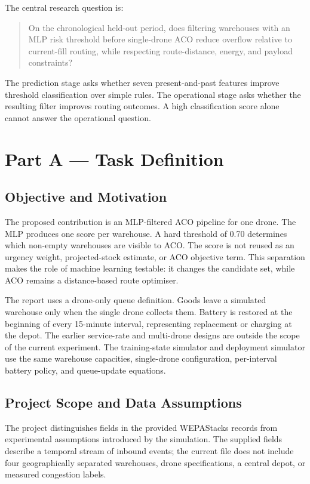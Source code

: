 \documentclass[10pt]{article}
\begin{document}
The central research question is:

\begin{quote}
On the chronological held-out period, does filtering warehouses with an MLP risk threshold before single-drone ACO reduce overflow relative to current-fill routing, while respecting route-distance, energy, and payload constraints?
\end{quote}

The prediction stage asks whether seven present-and-past features improve threshold classification over simple rules. The operational stage asks whether the resulting filter improves routing outcomes. A high classification score alone cannot answer the operational question.

\section{Part A --- Task Definition}

\subsection{Objective and Motivation}

The proposed contribution is an MLP-filtered ACO pipeline for one drone. The MLP produces one score per warehouse. A hard threshold of 0.70 determines which non-empty warehouses are visible to ACO. The score is not reused as an urgency weight, projected-stock estimate, or ACO objective term. This separation makes the role of machine learning testable: it changes the candidate set, while ACO remains a distance-based route optimiser.

The report uses a drone-only queue definition. Goods leave a simulated warehouse only when the single drone collects them. Battery is restored at the beginning of every 15-minute interval, representing replacement or charging at the depot. The earlier service-rate and multi-drone designs are outside the scope of the current experiment. The training-state simulator and deployment simulator use the same warehouse capacities, single-drone configuration, per-interval battery policy, and queue-update equations.

\subsection{Project Scope and Data Assumptions}

The project distinguishes fields in the provided WEPAStacks records from experimental assumptions introduced by the simulation. The supplied fields describe a temporal stream of inbound events; the current file does not include four geographically separated warehouses, drone specifications, a central depot, or measured congestion labels.
\end{document}
